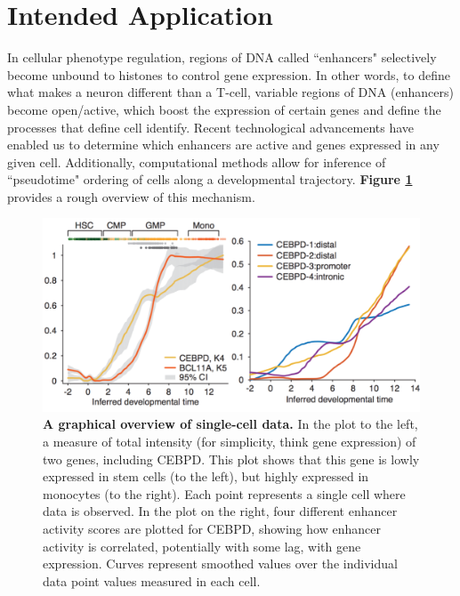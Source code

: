 \documentclass{article}\usepackage[]{graphicx}\usepackage[]{color}
\begin{document}
\section*{Intended Application}
In cellular phenotype regulation, regions of DNA called ``enhancers" selectively become unbound to histones to control gene expression. In other words, to define what makes a neuron different than a T-cell, variable regions of DNA (enhancers) become open/active, which boost the expression of certain genes and define the processes that define cell identify. Recent technological advancements have enabled us to determine which enhancers are active and genes expressed in any given cell. Additionally, computational methods allow for inference of ``pseudotime" ordering of cells along a developmental trajectory. \textbf{Figure \ref{fig:zero}} provides a rough overview of this mechanism. \newpage
 
 \begin{figure}[ht]
    \centering
    \includegraphics[width=\textwidth]{zero.png}
    \caption{\textbf{A graphical overview of single-cell data.} In the plot to the left, a measure of total intensity (for simplicity, think gene expression) of two genes, including CEBPD. This plot shows that this gene is lowly expressed in stem cells (to the left), but highly expressed in monocytes (to the right). Each point represents a single cell where data is observed. In the plot on the right, four different enhancer activity scores are plotted for CEBPD, showing how enhancer activity is correlated, potentially with some lag, with gene expression. Curves represent smoothed values over the individual data point values measured in each cell.}
    \label{fig:zero}
\end{figure}
\end{document}
